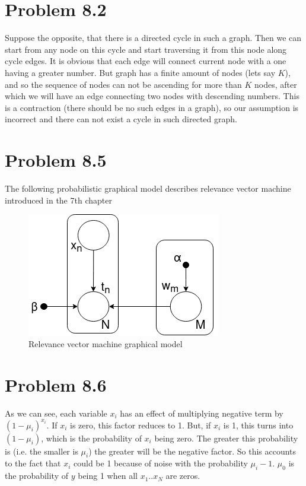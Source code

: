 \documentclass[fleqn]{article}
\begin{document}
\section*{Problem 8.2}

Suppose the opposite, that there is a directed cycle in such a graph. Then we can start from any node on this cycle and start traversing it from this node along cycle edges. It is obvious that each edge will connect current node with a one having a greater number. But graph has a finite amount of nodes (lets say $K$), and so the sequence of nodes can not be ascending for more than $K$ nodes, after which we will have an edge connecting two nodes with descending numbers. This is a contraction (there should be no such edges in a graph), so our assumption is incorrect and there can not exist a cycle in such directed graph. 

\section*{Problem 8.5}

The following probabilistic graphical model describes relevance vector machine introduced in the 7th chapter

\begin{figure}[h!]
	\centering
	\includegraphics[scale=0.5]{images/problem_8.5.png}
	\caption{Relevance vector machine graphical model}
	\label{fig:boat1}
\end{figure}

\section*{Problem 8.6}

As we can see, each variable $x_i$ has an effect of multiplying negative term by $(1 - \mu_i)^{x_i}$. If $x_i$ is zero, this factor reduces to 1. But, if $x_i$ is 1, this turns into $(1-\mu_i)$, which is the probability of $x_i$ being zero. The greater this probability is (i.e. the smaller is $\mu_i$) the greater will be the negative factor. So this accounts to the fact that $x_i$ could be 1 because of noise with the probability  $\mu_i - 1$. $\mu_0$ is the probability of $y$ being 1 when all $x_1..x_N$ are zeros. 
\end{document}
